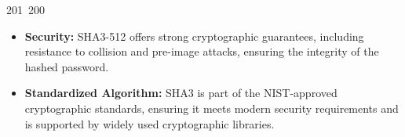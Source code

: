 201~200~\documentclass{article}
\begin{document}
\begin{itemize}
	                                                                                                                                                                                                                                                                                                	                                                                                                                                        	    	                                                                                                	                                                                                                                                                                                                                                                                                                                                	                                                                        	                                                                        	                                                                                                                                        	                                                                                \item \textbf{Security:} SHA3-512 offers strong cryptographic guarantees, including resistance to collision and pre-image attacks, ensuring the integrity of the hashed password.
	                                                                                                                                                                                                                                                                                                	                                                                                                                                        	    	                                                                                                	                                                                                                                                                                                                                                                                                                                                	                                                                        	                                                                        	                                                                                                                                        	                                                                                    \item \textbf{Standardized Algorithm:} SHA3 is part of the NIST-approved cryptographic standards, ensuring it meets modern security requirements and is supported by widely used cryptographic libraries.

\end{itemize}
\end{document}
